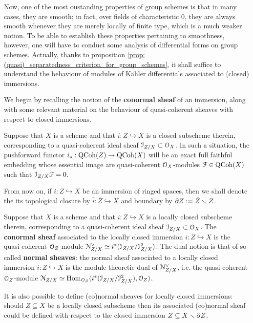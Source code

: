             Now, one of the most oustanding properties of group schemes is that in many cases, they are smooth; in fact, over fields of characteristic $0$, they are always smooth whenever they are merely locally of finite type, which is a much weaker notion. To be able to establish these properties pertaining to smoothness, however, one will have to conduct some analysis of differential forms on group schemes. Actually, thanks to proposition \ref{prop: (quasi)_separatedness_criterion_for_group_schemes}, it shall suffice to understand the behaviour of modules of K\"ahler differentials associated to (closed) immersions.
            
            We begin by recalling the notion of the \textbf{conormal sheaf} of an immersion, along with some relevant material on the behaviour of quasi-coherent sheaves with respect to closed immersions. 
            \begin{lemma} \label{lemma: quasi_coherent_sheaves_on_closed_subschemes}
                \cite[\href{https://stacks.math.columbia.edu/tag/01QY}{Tag 01QY}]{stacks} Suppose that $X$ is a scheme and that $i: Z \hookrightarrow X$ is a closed subscheme therein, corresponding to a quasi-coherent ideal sheaf $\mathcal{I}_{Z/X} \subset \mathcal{O}_X$. In such a situation, the pushforward functor $i_*: \mathrm{QCoh}(Z)\to \mathrm{QCoh}(X)$ will be an exact full faithful embedding whose essential image are quasi-coherent $\mathcal{O}_X$-modules $\mathcal{F} \in \mathrm{QCoh}(X)$ such that $\mathcal{I}_{Z/X} \mathcal{F} = 0$.
            \end{lemma}
            \begin{convention} \label{conv: closures_and_boundaries}
                From now on, if $i: Z \hookrightarrow X$ be an immersion of ringed spaces, then we shall denote the its topological closure by $\bar{i}: \bar{Z} \hookrightarrow X$ and boundary by $\partial Z := \bar{Z} \smallsetminus Z$. 
            \end{convention}
            \begin{definition} \label{def: (co)normal_sheaves_of_closed_immersions}
                Suppose that $X$ is a scheme and that $i: Z \hookrightarrow X$ is a locally closed subscheme therein, corresponding to a quasi-coherent ideal sheaf $\mathcal{I}_{Z/X} \subset \mathcal{O}_X$. The \textbf{conormal sheaf} associated to the locally closed immersion $i: Z \hookrightarrow X$ is the quasi-coherent $\mathcal{O}_Z$-module $\mathcal{N}_{Z/X}^{\vee} \simeq i^*(\mathcal{I}_{Z/X}/\mathcal{I}_{Z/X}^2)$. The dual notion is that of so-called \textbf{normal sheaves}: the normal sheaf associated to a locally closed immersion $i: Z \hookrightarrow X$ is the module-theoretic dual of $\mathcal{N}_{Z/X}^{\vee}$, i.e. the quasi-coherent $\mathcal{O}_Z$-module $\mathcal{N}_{Z/X} \simeq \mathrm{Hom}_{\mathcal{O}_Z}(i^*(\mathcal{I}_{Z/X}/\mathcal{I}_{Z/X}^2), \mathcal{O}_Z)$. 
                
                It is also possible to define (co)normal sheaves for locally closed immersions: should $Z \subseteq X$ be a locally closed subscheme then its associated (co)normal sheaf could be defined with respect to the closed immersion $Z \subseteq X \smallsetminus \partial Z$.
            \end{definition} 
